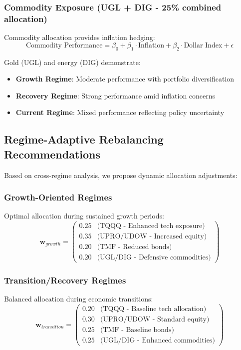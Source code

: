 \documentclass[onecolumn,11pt]{IEEEtran}
\begin{document}
\subsubsection{Commodity Exposure (UGL + DIG - 25\% combined allocation)}

Commodity allocation provides inflation hedging:
\begin{equation}
\text{Commodity Performance} = \beta_0 + \beta_1 \cdot \text{Inflation} + \beta_2 \cdot \text{Dollar Index} + \epsilon
\end{equation}

Gold (UGL) and energy (DIG) demonstrate:
\begin{itemize}
    \item \textbf{Growth Regime}: Moderate performance with portfolio diversification
    \item \textbf{Recovery Regime}: Strong performance amid inflation concerns
    \item \textbf{Current Regime}: Mixed performance reflecting policy uncertainty
\end{itemize}

\subsection{Regime-Adaptive Rebalancing Recommendations}

Based on cross-regime analysis, we propose dynamic allocation adjustments:

\subsubsection{Growth-Oriented Regimes}
Optimal allocation during sustained growth periods:
\begin{equation}
\mathbf{w}_{growth} = \begin{pmatrix}
0.25 & \text{(TQQQ - Enhanced tech exposure)} \\
0.35 & \text{(UPRO/UDOW - Increased equity)} \\
0.20 & \text{(TMF - Reduced bonds)} \\
0.20 & \text{(UGL/DIG - Defensive commodities)}
\end{pmatrix}
\end{equation}

\subsubsection{Transition/Recovery Regimes}
Balanced allocation during economic transitions:
\begin{equation}
\mathbf{w}_{transition} = \begin{pmatrix}
0.20 & \text{(TQQQ - Baseline tech allocation)} \\
0.30 & \text{(UPRO/UDOW - Standard equity)} \\
0.25 & \text{(TMF - Baseline bonds)} \\
0.25 & \text{(UGL/DIG - Enhanced commodities)}
\end{pmatrix}
\end{equation}
\end{document}

